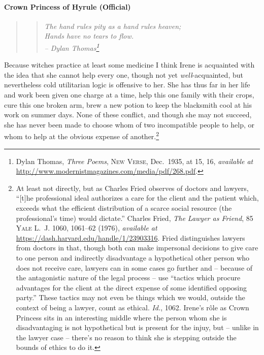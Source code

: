   \paragraph{Crown Princess of Hyrule (Official)}\label{sec:machiavelli}
      \begin{quote}
      \begin{verse}\begingroup\it 
      The hand rules pity as a hand rules heaven;\\
      Hands have no tears to flow.\endgroup\\
      \hfill -- Dylan Thomas\footnote{Dylan Thomas, \textit{Three Poems}, \textsc{New Verse}, Dec.~1935, at 15, 16, \textit{available at} \url{http://www.modernistmagazines.com/media/pdf/268.pdf}.}
      \end{verse}
      \end{quote}
    Because witches practice at least some medicine I think Irene is acquainted with the idea that she cannot help every one, though not yet \emph{well}-acquainted, but nevertheless cold utilitarian logic is offensive to her. She has thus far in her life and work been given one charge at a time, help this one family with their crops, cure this one broken arm, brew a new potion to keep the blacksmith cool at his work on summer days. None of these conflict, and though she may not succeed, she has never been made to choose whom of two incompatible people to help, or whom to help at the obvious expense of another.\footnote{%
      At least not directly, but as Charles Fried observes of doctors and lawyers, ``[t]he professional ideal authorizes a care for the client and the patient which, exceeds what the efficient distribution of a scarce social resource (the professional's time) would dictate.'' Charles Fried, \textit{The Lawyer as Friend}, \textsc{85 Yale L.~J.} 1060, 1061--62 (1976), \textit{available at} \url{https://dash.harvard.edu/handle/1/23903316}. Fried distinguishes lawyers from doctors in that, though both can make impersonal decisions to give care to one person and indirectly disadvantage a hypothetical other person who does not receive care, lawyers can in some cases go further and -- because of the antagonistic nature of the legal process -- use ``tactics which procure advantages for the client at the direct expense of some identified opposing party.'' These tactics may not even be things which we would, outside the context of being a lawyer, count as ethical. \textit{Id.}, 1062.  Irene's r\^ole as Crown Princess sits in an interesting middle where the person whom she is disadvantaging is not hypothetical but is present for the injuy, but -- unlike in the lawyer case -- there's no reason to think she is stepping outside the bounds of ethics to do it.} 

